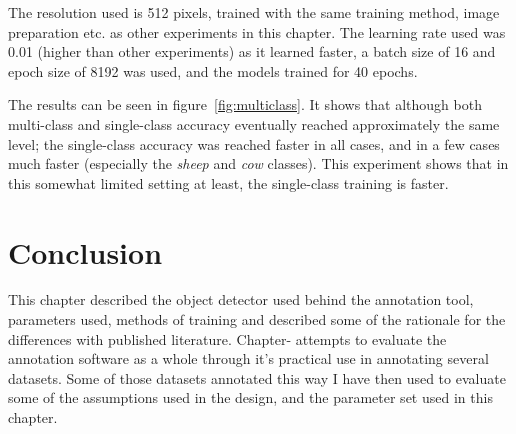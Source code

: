 The resolution used is 512 pixels, trained with the same training method, image preparation etc. as other experiments in this chapter. The learning rate used was 0.01 (higher than other experiments) as it learned faster, a batch size of 16 and epoch size of 8192 was used, and the models trained for 40 epochs. 

The results can be seen in figure~\ref{fig:multiclass}. It shows that although both multi-class and single-class accuracy eventually reached approximately the same level; the single-class accuracy was reached faster in all cases, and in a few cases much faster (especially the \emph{sheep} and \emph{cow} classes). This experiment shows that in this somewhat limited setting at least, the single-class training is faster.



\section {Conclusion}

This chapter described the object detector used behind the annotation tool, parameters used, methods of training and described some of the rationale for the differences with published literature. Chapter-\label{chap:annotation} attempts to evaluate the annotation software as a whole through it's practical use in annotating several datasets. Some of those datasets annotated this way I have then used to evaluate some of the assumptions used in the design, and the parameter set used in this chapter. 


